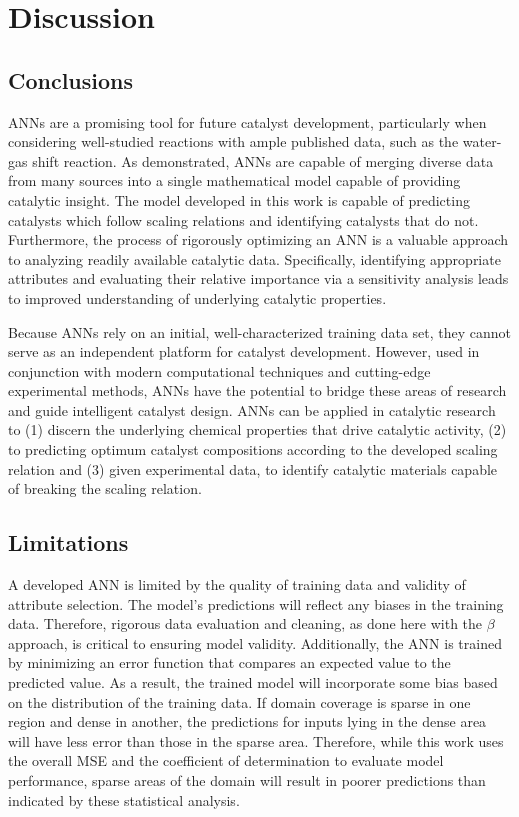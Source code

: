\chapter{Discussion}
\label{ch:discussion}
\section{Conclusions}
ANNs are a promising tool for future catalyst development, particularly when considering well-studied reactions with ample published data, such as the water-gas shift reaction. As demonstrated, ANNs are capable of merging diverse data from many sources into a single mathematical model capable of providing catalytic insight. The model developed in this work is capable of predicting catalysts which follow scaling relations and identifying catalysts that do not. Furthermore, the process of rigorously optimizing an ANN is a valuable approach to analyzing readily available catalytic data. Specifically, identifying appropriate attributes and evaluating their relative importance via a sensitivity analysis leads to improved understanding of underlying catalytic properties. 

Because ANNs rely on an initial, well-characterized training data set, they cannot serve as an independent platform for catalyst development. However, used in conjunction with modern computational techniques and cutting-edge experimental methods, ANNs have the potential to bridge these areas of research and guide intelligent catalyst design. ANNs can be applied in catalytic research to (1) discern the underlying chemical properties that drive catalytic activity, (2) to predicting optimum catalyst compositions according to the developed scaling relation and (3) given experimental data, to identify catalytic materials capable of breaking the scaling relation. 
\section{Limitations}
A developed ANN is limited by the quality of training data and validity of attribute selection. The model's predictions will reflect any biases in the training data. Therefore, rigorous data evaluation and cleaning, as done here with the $\beta$ approach, is critical to ensuring model validity. Additionally, the ANN is trained by minimizing an error function that compares an expected value to the predicted value. As a result, the trained model will incorporate some bias based on the distribution of the training data. If domain coverage is sparse in one region and dense in another, the predictions for inputs lying in the dense area will have less error than those in the sparse area. Therefore, while this work uses the overall MSE and the coefficient of determination to evaluate model performance, sparse areas of the domain will result in poorer predictions than indicated by these statistical analysis. 

